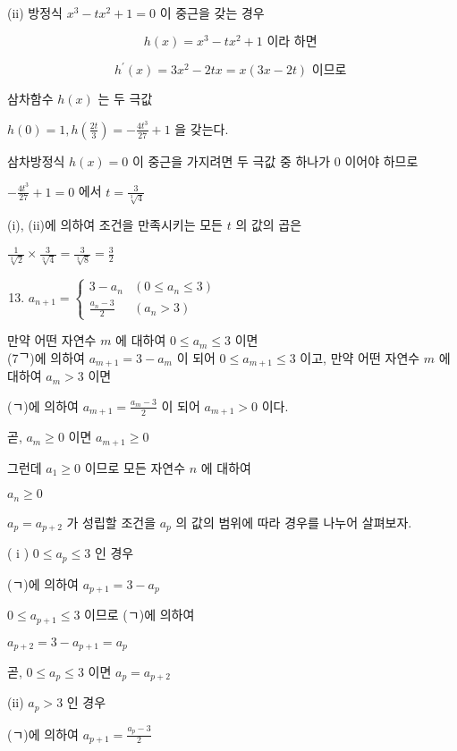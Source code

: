 \documentclass[10pt]{article}
\begin{document}
(ii) 방정식 $x^{3}-t x^{2}+1=0$ 이 중근을 갖는 경우

\[
h(x)=x^{3}-t x^{2}+1 \text { 이라 하면 }
\]

\[
h^{\prime}(x)=3 x^{2}-2 t x=x(3 x-2 t) \text { 이므로 }
\]

삼차함수 $h(x)$ 는 두 극값

$h(0)=1, h\left(\frac{2 t}{3}\right)=-\frac{4 t^{3}}{27}+1$ 을 갖는다.

삼차방정식 $h(x)=0$ 이 중근을 가지려면 두 극값 중 하나가 0 이어야 하므로

$-\frac{4 t^{3}}{27}+1=0$ 에서 $t=\frac{3}{\sqrt[3]{4}}$

(i), (ii)에 의하여 조건을 만족시키는 모든 $t$ 의 값의 곱은

$\frac{1}{\sqrt[3]{2}} \times \frac{3}{\sqrt[3]{4}}=\frac{3}{\sqrt[3]{8}}=\frac{3}{2}$

\begin{enumerate}
  \setcounter{enumi}{12}
  \item $a_{n+1}= \begin{cases}3-a_{n} & \left(0 \leq a_{n} \leq 3\right) \\ \frac{a_{n}-3}{2} & \left(a_{n}>3\right)\end{cases}$
\end{enumerate}

만약 어떤 자연수 $m$ 에 대하여 $0 \leq a_{m} \leq 3$ 이면\\
(7ᄀ)에 의하여 $a_{m+1}=3-a_{m}$ 이 되어 $0 \leq a_{m+1} \leq 3$ 이고, 만약 어떤 자연수 $m$ 에 대하여 $a_{m}>3$ 이면

(ㄱ)에 의하여 $a_{m+1}=\frac{a_{m}-3}{2}$ 이 되어 $a_{m+1}>0$ 이다.

곧, $a_{m} \geq 0$ 이면 $a_{m+1} \geq 0$

그런데 $a_{1} \geq 0$ 이므로 모든 자연수 $n$ 에 대하여

$a_{n} \geq 0$

$a_{p}=a_{p+2}$ 가 성립할 조건을 $a_{p}$ 의 값의 범위에 따라 경우를 나누어 살펴보자.

( i ) $0 \leq a_{p} \leq 3$ 인 경우

(ㄱ)에 의하여 $a_{p+1}=3-a_{p}$

$0 \leq a_{p+1} \leq 3$ 이므로 (ㄱ)에 의하여

$a_{p+2}=3-a_{p+1}=a_{p}$

곧, $0 \leq a_{p} \leq 3$ 이면 $a_{p}=a_{p+2}$

(ii) $a_{p}>3$ 인 경우

(ㄱ)에 의하여 $a_{p+1}=\frac{a_{p}-3}{2}$
\end{document}
